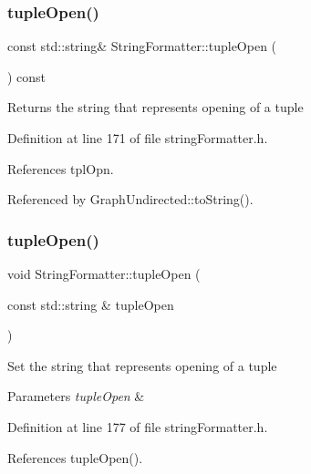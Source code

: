 \subsubsection{\texorpdfstring{tuple\+Open()}{tupleOpen()}\hspace{0.1cm}{\footnotesize\ttfamily [1/2]}}
{\footnotesize\ttfamily const std\+::string\& String\+Formatter\+::tuple\+Open (\begin{DoxyParamCaption}{ }\end{DoxyParamCaption}) const\hspace{0.3cm}{\ttfamily [inline]}}

\begin{DoxyReturn}{Returns}
the string that represents opening of a tuple 
\end{DoxyReturn}


Definition at line 171 of file string\+Formatter.\+h.



References tpl\+Opn.



Referenced by Graph\+Undirected\+::to\+String().

\mbox{\label{classStringFormatter_a00feccf99bdd348dd6ffc2af29cb9ec7}} 
\subsubsection{\texorpdfstring{tuple\+Open()}{tupleOpen()}\hspace{0.1cm}{\footnotesize\ttfamily [2/2]}}
{\footnotesize\ttfamily void String\+Formatter\+::tuple\+Open (\begin{DoxyParamCaption}\item[{const std\+::string \&}]{tuple\+Open }\end{DoxyParamCaption})\hspace{0.3cm}{\ttfamily [inline]}}

Set the string that represents opening of a tuple 
\begin{DoxyParams}{Parameters}
{\em tuple\+Open} & \\
\hline
\end{DoxyParams}


Definition at line 177 of file string\+Formatter.\+h.



References tuple\+Open().



